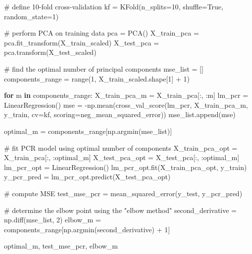 \documentclass[
  letterpaper,
  DIV=11,
  numbers=noendperiod]{scrartcl}
\newenvironment{Shaded}{\begin{snugshade}}{\end{snugshade}}
\newcommand{\BuiltInTok}[1]{\textcolor[rgb]{0.00,0.23,0.31}{#1}}
\newcommand{\CommentTok}[1]{\textcolor[rgb]{0.37,0.37,0.37}{#1}}
\newcommand{\ControlFlowTok}[1]{\textcolor[rgb]{0.00,0.23,0.31}{\textbf{#1}}}
\newcommand{\DecValTok}[1]{\textcolor[rgb]{0.68,0.00,0.00}{#1}}
\newcommand{\KeywordTok}[1]{\textcolor[rgb]{0.00,0.23,0.31}{\textbf{#1}}}
\newcommand{\NormalTok}[1]{\textcolor[rgb]{0.00,0.23,0.31}{#1}}
\newcommand{\OperatorTok}[1]{\textcolor[rgb]{0.37,0.37,0.37}{#1}}
\newcommand{\StringTok}[1]{\textcolor[rgb]{0.13,0.47,0.30}{#1}}
\newcommand{\VariableTok}[1]{\textcolor[rgb]{0.07,0.07,0.07}{#1}}
\begin{document}
\begin{Shaded}
\begin{Highlighting}[]
\CommentTok{\# define 10{-}fold cross{-}validation}
\NormalTok{kf }\OperatorTok{=}\NormalTok{ KFold(n\_splits}\OperatorTok{=}\DecValTok{10}\NormalTok{, shuffle}\OperatorTok{=}\VariableTok{True}\NormalTok{, random\_state}\OperatorTok{=}\DecValTok{1}\NormalTok{)}

\CommentTok{\# perform PCA on training data}
\NormalTok{pca }\OperatorTok{=}\NormalTok{ PCA()}
\NormalTok{X\_train\_pca }\OperatorTok{=}\NormalTok{ pca.fit\_transform(X\_train\_scaled)}
\NormalTok{X\_test\_pca }\OperatorTok{=}\NormalTok{ pca.transform(X\_test\_scaled)}

\CommentTok{\# find the optimal number of principal components}
\NormalTok{mse\_list }\OperatorTok{=}\NormalTok{ []}
\NormalTok{components\_range }\OperatorTok{=} \BuiltInTok{range}\NormalTok{(}\DecValTok{1}\NormalTok{, X\_train\_scaled.shape[}\DecValTok{1}\NormalTok{] }\OperatorTok{+} \DecValTok{1}\NormalTok{)}

\ControlFlowTok{for}\NormalTok{ m }\KeywordTok{in}\NormalTok{ components\_range:}
\NormalTok{    X\_train\_pca\_m }\OperatorTok{=}\NormalTok{ X\_train\_pca[:, :m]}
\NormalTok{    lm\_pcr }\OperatorTok{=}\NormalTok{ LinearRegression()}
\NormalTok{    mse }\OperatorTok{=} \OperatorTok{{-}}\NormalTok{np.mean(cross\_val\_score(lm\_pcr, X\_train\_pca\_m,}
\NormalTok{                   y\_train, cv}\OperatorTok{=}\NormalTok{kf, scoring}\OperatorTok{=}\StringTok{\textquotesingle{}neg\_mean\_squared\_error\textquotesingle{}}\NormalTok{))}
\NormalTok{    mse\_list.append(mse)}

\NormalTok{optimal\_m }\OperatorTok{=}\NormalTok{ components\_range[np.argmin(mse\_list)]}

\CommentTok{\# fit PCR model using optimal number of components}
\NormalTok{X\_train\_pca\_opt }\OperatorTok{=}\NormalTok{ X\_train\_pca[:, :optimal\_m]}
\NormalTok{X\_test\_pca\_opt }\OperatorTok{=}\NormalTok{ X\_test\_pca[:, :optimal\_m]}
\NormalTok{lm\_pcr\_opt }\OperatorTok{=}\NormalTok{ LinearRegression()}
\NormalTok{lm\_pcr\_opt.fit(X\_train\_pca\_opt, y\_train)}
\NormalTok{y\_pcr\_pred }\OperatorTok{=}\NormalTok{ lm\_pcr\_opt.predict(X\_test\_pca\_opt)}

\CommentTok{\# compute MSE}
\NormalTok{test\_mse\_pcr }\OperatorTok{=}\NormalTok{ mean\_squared\_error(y\_test, y\_pcr\_pred)}

\CommentTok{\# determine the elbow point using the "elbow method"}
\NormalTok{second\_derivative }\OperatorTok{=}\NormalTok{ np.diff(mse\_list, }\DecValTok{2}\NormalTok{)}
\NormalTok{elbow\_m }\OperatorTok{=}\NormalTok{ components\_range[np.argmin(second\_derivative) }\OperatorTok{+} \DecValTok{1}\NormalTok{]}

\NormalTok{optimal\_m, test\_mse\_pcr, elbow\_m}
\end{Highlighting}
\end{Shaded}
\end{document}
